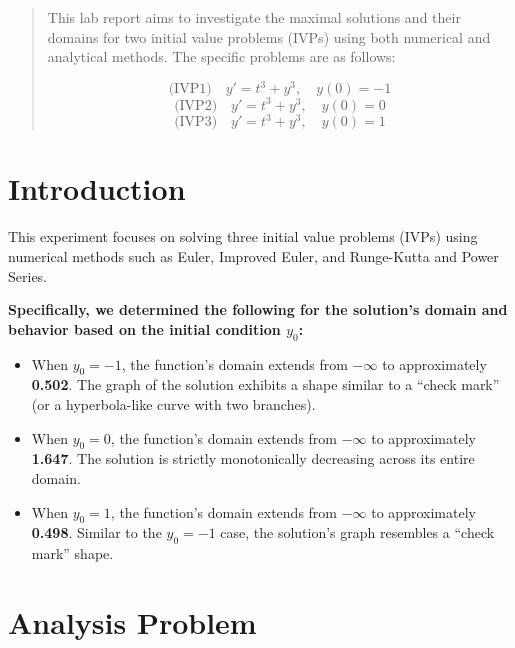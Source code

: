 \documentclass{article}
\begin{document}
\begin{abstract}

This lab report aims to investigate the maximal solutions and their domains for two initial value problems (IVPs) using both numerical and analytical methods. The specific problems are as follows: 

\begin{equation*}
    \text{(IVP1)} \quad y' = t^3 +y^3, \quad y(0) = -1
\end{equation*}
\begin{equation*}
    \text{(IVP2)} \quad y' = t^3 +y^3, \quad y(0) = 0
\end{equation*}
\begin{equation*}
    \text{(IVP3)} \quad y' = t^3 +y^3, \quad y(0) = 1
\end{equation*}
\end{abstract}

\section{Introduction}


This experiment focuses on solving three initial value problems (IVPs) using numerical methods such as Euler, Improved Euler, and Runge-Kutta and Power Series.


\textbf{Specifically, we determined the following for the solution's domain and behavior based on the initial condition $y_0$:}

\begin{itemize}
    \item When \textbf{$y_0 = -1$}, the function's domain extends from $-\infty$ to approximately \textbf{0.502}. The graph of the solution exhibits a shape similar to a ``check mark'' (or a hyperbola-like curve with two branches).
    \item When \textbf{$y_0 = 0$}, the function's domain extends from $-\infty$ to approximately \textbf{1.647}. The solution is strictly monotonically decreasing across its entire domain.
    \item When \textbf{$y_0 = 1$}, the function's domain extends from $-\infty$ to approximately \textbf{0.498}. Similar to the $y_0 = -1$ case, the solution's graph resembles a ``check mark'' shape.
\end{itemize}


\section{Analysis Problem }
\end{document}
